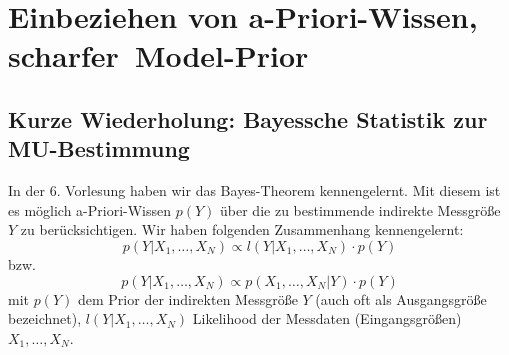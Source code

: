 

% 

\section{Einbeziehen von a-Priori-Wissen, \glqq scharfer\grqq ~Model-Prior}
\subsection{Kurze Wiederholung: Bayessche Statistik zur MU-Bestimmung}
In der 6. Vorlesung haben wir das Bayes-Theorem kennengelernt. 
Mit diesem ist es möglich a-Priori-Wissen $p(Y)$ über die zu bestimmende indirekte Messgröße $Y$ zu berücksichtigen.
Wir haben folgenden Zusammenhang kennengelernt: 
\begin{equation}
p(Y|X_1,\ldots,X_N) \propto l(Y|X_1,\ldots,X_N) \cdot p(Y) 
\label{eq:BayesTheorem}
\end{equation} 
bzw. 
\[
p(Y|X_1,\ldots,X_N) \propto p(X_1,\ldots,X_N|Y) \cdot p(Y) 
\] 
mit $p(Y)$ dem Prior der indirekten Messgröße $Y$ (auch oft als Ausgangsgröße bezeichnet), $l(Y|X_1,\ldots,X_N)$ Likelihood der Messdaten 
(Eingangsgrößen) $X_1,\ldots,X_N$. 

